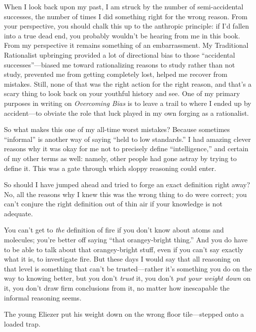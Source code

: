{
 When I look back upon my past, I am struck by the number of
semi-accidental successes, the number of times I did something right
for the wrong reason. From your perspective, you should chalk this up
to the anthropic principle: if I'd fallen into a true
dead end, you probably wouldn't be hearing from me in
this book. From my perspective it remains something of an
embarrassment. My Traditional Rationalist upbringing provided a lot of
directional bias to those ``accidental
successes''---biased me toward rationalizing reasons
to study rather than not study, prevented me from getting completely
lost, helped me recover from mistakes. Still, none of that was the
right action for the right reason, and that's a scary
thing to look back on your youthful history and see. One of my primary
purposes in writing on \textit{Overcoming Bias} is to leave a trail to
where I ended up by accident---to obviate the role that luck played in
my own forging as a rationalist.}

{
 So what makes this one of my all-time worst mistakes? Because
sometimes ``informal'' is another
way of saying ``held to low
standards.'' I had amazing clever reasons why it was
okay for me not to precisely define
``intelligence,'' and certain of my
other terms as well: namely, other people had gone astray by trying to
define it. This was a gate through which sloppy reasoning could enter.}

{
 So should I have jumped ahead and tried to forge an exact
definition right away? No, all the reasons why I knew this was the
wrong thing to do were correct; you can't conjure the
right definition out of thin air if your knowledge is not adequate.}

{
 You can't get to \textit{the} definition of fire
if you don't know about atoms and molecules;
you're better off saying ``that
orangey-bright thing.'' And you do have to be able to
talk about that orangey-bright stuff, even if you can't
say exactly what it is, to investigate fire. But these days I would say
that all reasoning on that level is something that
can't be trusted---rather it's
something you do on the way to knowing better, but you
don't \textit{trust} it, you don't
\textit{put your weight down} on it, you don't draw
firm conclusions from it, no matter how inescapable the informal
reasoning seems.}

{
 The young Eliezer put his weight down on the wrong floor
tile---stepped onto a loaded trap.}

\myendsectiontext


